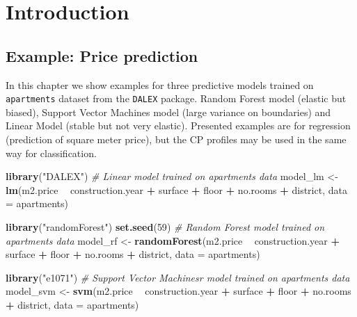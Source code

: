 \documentclass[]{book}
\newenvironment{Shaded}{\begin{snugshade}}{\end{snugshade}}
\newcommand{\CommentTok}[1]{\textcolor[rgb]{0.56,0.35,0.01}{\textit{#1}}}
\newcommand{\DataTypeTok}[1]{\textcolor[rgb]{0.13,0.29,0.53}{#1}}
\newcommand{\DecValTok}[1]{\textcolor[rgb]{0.00,0.00,0.81}{#1}}
\newcommand{\KeywordTok}[1]{\textcolor[rgb]{0.13,0.29,0.53}{\textbf{#1}}}
\newcommand{\NormalTok}[1]{#1}
\newcommand{\OperatorTok}[1]{\textcolor[rgb]{0.81,0.36,0.00}{\textbf{#1}}}
\newcommand{\StringTok}[1]{\textcolor[rgb]{0.31,0.60,0.02}{#1}}
\theoremstyle{definition}
\theoremstyle{definition}
\theoremstyle{definition}
\theoremstyle{remark}
\begin{document}
\hypertarget{introduction-3}{%
\chapter{Introduction}\label{introduction-3}}

\hypertarget{example-price-prediction}{%
\section{Example: Price prediction}\label{example-price-prediction}}

\citep{R-DALEX}

In this chapter we show examples for three predictive models trained on
\texttt{apartments} dataset from the \texttt{DALEX} package. Random
Forest model (elastic but biased), Support Vector Machines model (large
variance on boundaries) and Linear Model (stable but not very elastic).
Presented examples are for regression (prediction of square meter
price), but the CP profiles may be used in the same way for
classification.

\begin{Shaded}
\begin{Highlighting}[]
\KeywordTok{library}\NormalTok{(}\StringTok{"DALEX"}\NormalTok{)}
\CommentTok{# Linear model trained on apartments data}
\NormalTok{model_lm <-}\StringTok{ }\KeywordTok{lm}\NormalTok{(m2.price }\OperatorTok{~}\StringTok{ }\NormalTok{construction.year }\OperatorTok{+}\StringTok{ }\NormalTok{surface }\OperatorTok{+}\StringTok{ }\NormalTok{floor }\OperatorTok{+}\StringTok{ }
\StringTok{                      }\NormalTok{no.rooms }\OperatorTok{+}\StringTok{ }\NormalTok{district, }\DataTypeTok{data =}\NormalTok{ apartments)}

\KeywordTok{library}\NormalTok{(}\StringTok{"randomForest"}\NormalTok{)}
\KeywordTok{set.seed}\NormalTok{(}\DecValTok{59}\NormalTok{)}
\CommentTok{# Random Forest model trained on apartments data}
\NormalTok{model_rf <-}\StringTok{ }\KeywordTok{randomForest}\NormalTok{(m2.price }\OperatorTok{~}\StringTok{ }\NormalTok{construction.year }\OperatorTok{+}\StringTok{ }\NormalTok{surface }\OperatorTok{+}\StringTok{ }\NormalTok{floor }\OperatorTok{+}\StringTok{ }
\StringTok{                      }\NormalTok{no.rooms }\OperatorTok{+}\StringTok{ }\NormalTok{district, }\DataTypeTok{data =}\NormalTok{ apartments)}

\KeywordTok{library}\NormalTok{(}\StringTok{"e1071"}\NormalTok{)}
\CommentTok{# Support Vector Machinesr model trained on apartments data}
\NormalTok{model_svm <-}\StringTok{ }\KeywordTok{svm}\NormalTok{(m2.price }\OperatorTok{~}\StringTok{ }\NormalTok{construction.year }\OperatorTok{+}\StringTok{ }\NormalTok{surface }\OperatorTok{+}\StringTok{ }\NormalTok{floor }\OperatorTok{+}\StringTok{ }
\StringTok{                         }\NormalTok{no.rooms }\OperatorTok{+}\StringTok{ }\NormalTok{district, }\DataTypeTok{data =}\NormalTok{ apartments)}
\end{Highlighting}
\end{Shaded}
\end{document}
